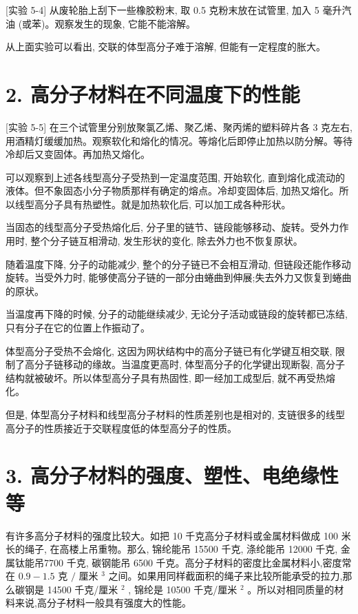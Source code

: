 \documentclass[10pt]{article}
\begin{document}
[实验 5-4] 从废轮胎上刮下一些橡胶粉末, 取 0.5 克粉末放在试管里, 加入 5 毫升汽油 (或苯)。观察发生的现象, 它能不能溶解。

从上面实验可以看出, 交联的体型高分子难于溶解, 但能有一定程度的胀大。

\section*{2. 高分子材料在不同温度下的性能}

[实验 5-5] 在三个试管里分别放聚氯乙烯、聚乙烯、聚丙烯的塑料碎片各 3 克左右, 用酒精灯缓缓加热。观察软化和熔化的情况。等熔化后即停止加热以防分解。等待冷却后又变固体。再加热又熔化。

可以观察到上述各线型高分子受热到一定温度范围, 开始软化, 直到熔化成流动的液体。但不象固态小分子物质那样有确定的熔点。冷却变固体后, 加热又熔化。所以线型高分子具有热塑性。就是加热软化后, 可以加工成各种形状。

当固态的线型高分子受热熔化后, 分子里的链节、链段能够移动、旋转。受外力作用时, 整个分子链互相滑动, 发生形状的变化, 除去外力也不恢复原状。

随着温度下降, 分子的动能减少, 整个的分子链已不会相互滑动, 但链段还能作移动旋转。当受外力时, 能够使高分子链的一部分由蜷曲到伸展;失去外力又恢复到蜷曲的原状。

当温度再下降的时候, 分子的动能继续减少, 无论分子活动或链段的旋转都已冻结, 只有分子在它的位置上作振动了。

体型高分子受热不会熔化, 这因为网状结构中的高分子链已有化学键互相交联, 限制了高分子链移动的缘故。当温度更高时, 体型高分子的化学键出现断裂, 高分子结构就被破坏。所以体型高分子具有热固性, 即一经加工成型后, 就不再受热熔化。

但是, 体型高分子材料和线型高分子材料的性质差别也是相对的, 支链很多的线型高分子的性质接近于交联程度低的体型高分子的性质。

\section*{3. 高分子材料的强度、塑性、电绝缘性等}

有许多高分子材料的强度比较大。如把 10 千克高分子材料或金属材料做成 100 米长的绳子, 在高楼上吊重物。那么, 锦纶能吊 15500 千克, 涤纶能吊 12000 千克, 金属钛能吊7700 千克, 碳钢能吊 6500 千克。高分子材料的密度比金属材料小,密度常在 \({0.9} - {1.5}\) 克 \(/\) 厘米 \({}^{3}\) 之间。如果用同样截面积的绳子来比较所能承受的拉力,那么碳钢是 14500 千克/厘米 \({}^{2}\) , 锦纶是 10500 千克/厘米 \({}^{2}\) 。所以对相同质量的材料来说,高分子材料一般具有强度大的性能。
\end{document}
